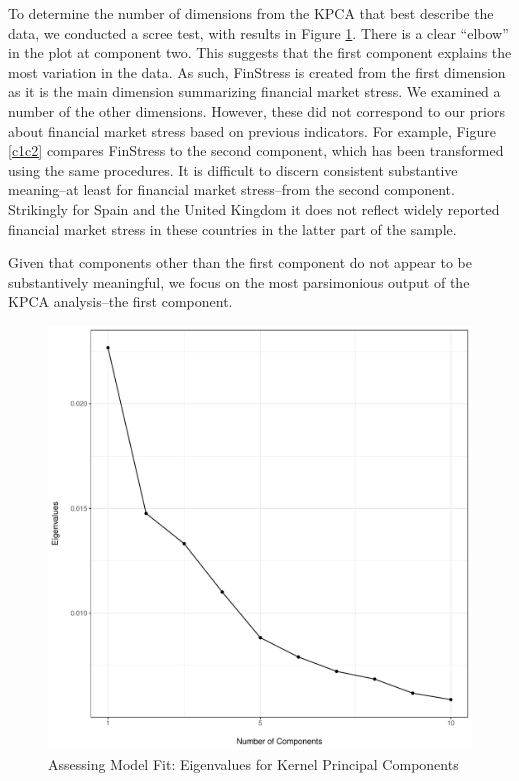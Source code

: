 \documentclass[]{article}
\begin{document}
To determine the number of dimensions from the KPCA that best describe the data, we conducted a scree test, with results in Figure \ref{scree_plot}. There is a clear ``elbow'' in the plot at component two. This suggests that the first component explains the most variation in the data. As such, FinStress is created from the first dimension as it is the main dimension summarizing financial market stress. We examined a number of the other dimensions. However, these did not correspond to our priors about financial market stress based on previous indicators. For example, Figure \ref{c1c2} compares FinStress to the second component, which has been transformed using the same procedures. It is difficult to discern consistent substantive meaning--at least for financial market stress--from the second component. Strikingly for Spain and the United Kingdom it does not reflect widely reported financial market stress in these countries in the latter part of the sample.

Given that components other than the first component do not appear to be substantively meaningful, we focus on the most parsimonious output of the KPCA analysis--the first component.

\begin{figure}
    \caption{Assessing Model Fit: Eigenvalues for Kernel Principal Components}
    \label{scree_plot}
    \begin{center}
        \includegraphics[scale=0.45]{figures/scree_plot.pdf}
    \end{center}
\end{figure}
\end{document}
